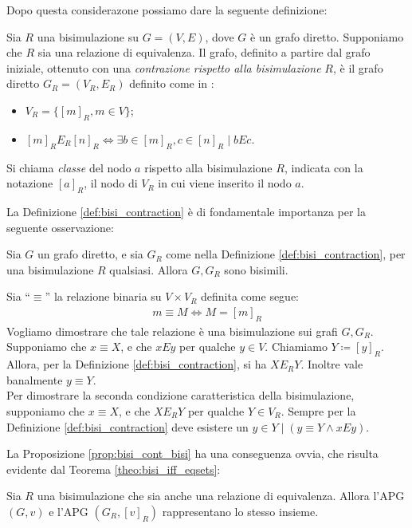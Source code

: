 Dopo questa considerazone possiamo dare la seguente definizione:
\begin{definition}
    \label{def:bisi_contraction}
    Sia $R$ una bisimulazione su $G = (V,E)$, dove $G$ è un grafo diretto. Supponiamo che $R$ sia una relazione di equivalenza. Il grafo, definito a partire dal grafo iniziale, ottenuto con una \emph{contrazione rispetto alla bisimulazione} $R$, è il grafo diretto $G_R = (V_R, E_R)$ definito come in \cite{gentilini}:
    \begin{itemize}
        \item $V_R = \{[m]_R, m \in V\}$;
        \item $[m]_R E_R [n]_R \iff \exists b \in [m]_R, c \in [n]_R \mid b E c$.
    \end{itemize}
    Si chiama \emph{classe} del nodo $a$ rispetto alla bisimulazione $R$, indicata con la notazione $[a]_R$, il nodo di $V_R$ in cui viene inserito il nodo $a$.
\end{definition}
La Definizione \ref{def:bisi_contraction} è di fondamentale importanza per la seguente osservazione:
\begin{proposition}
    Sia $G$ un grafo diretto, e sia $G_R$ come nella Definizione \ref{def:bisi_contraction}, per una bisimulazione $R$ qualsiasi. Allora $G, G_R$ sono bisimili.
    \label{prop:bisi_cont_bisi}
\end{proposition}
\begin{proof2}
    Sia ``$\equiv$'' la relazione binaria su $V\times V_R$ definita come segue:
    \begin{gather*}
        m \equiv M \iff M = [m]_R
    \end{gather*}
    Vogliamo dimostrare che tale relazione è una bisimulazione sui grafi $G, G_R$.\\
    Supponiamo che $x \equiv X$, e che $x E y$ per qualche $y \in V$. Chiamiamo $Y \coloneqq [y]_R$. Allora, per la Definizione \ref{def:bisi_contraction}, si ha $X E_R Y$. Inoltre vale banalmente $y \equiv Y$.\\
    Per dimostrare la seconda condizione caratteristica della bisimulazione, supponiamo che $x \equiv X$, e che $X E_R Y$ per qualche $Y \in V_R$. Sempre per la Definizione \ref{def:bisi_contraction} deve esistere un $y \in Y \mid (y \equiv Y \land x E y)$.
\end{proof2}
La Proposizione \ref{prop:bisi_cont_bisi} ha una conseguenza ovvia, che risulta evidente dal Teorema \ref{theo:bisi_iff_eqsets}:
\begin{corollary}
    Sia $R$ una bisimulazione che sia anche una relazione di equivalenza. Allora l'APG $(G, v)$ e l'APG $(G_R, [v]_R)$ rappresentano lo stesso insieme.
\end{corollary}
